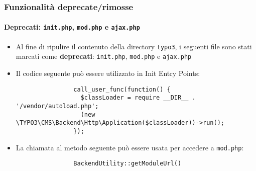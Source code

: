 \begin{frame}[fragile]
	\frametitle{Funzionalità deprecate/rimosse}
	\framesubtitle{Deprecati: \texttt{init.php}, \texttt{mod.php} e \texttt{ajax.php}}


	\begin{itemize}

		\item Al fine di ripulire il contenuto della directory \texttt{typo3}, i seguenti file sono stati
			marcati come \textbf{deprecati}: \texttt{init.php}, \texttt{mod.php} e \texttt{ajax.php}

		\item Il codice seguente può essere utilizzato in Init Entry Points:

			\begin{lstlisting}
				call_user_func(function() {
				  $classLoader = require __DIR__ . '/vendor/autoload.php';
				  (new \TYPO3\CMS\Backend\Http\Application($classLoader))->run();
				});
			\end{lstlisting}

		\item La chiamata al metodo seguente può essere usata per accedere a \texttt{mod.php}:

			\begin{lstlisting}
				BackendUtility::getModuleUrl()
			\end{lstlisting}

	\end{itemize}

\end{frame}


